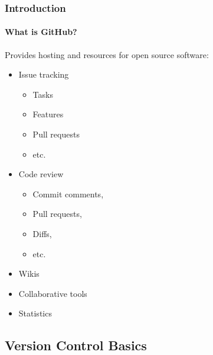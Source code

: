 \documentclass{beamer}
\begin{document}
\begin{frame}
 \frametitle{Introduction}
 \framesubtitle{What is GitHub?}

 Provides hosting and resources for open source software:
 \begin{itemize}
  \item Issue tracking
   \begin{itemize}
    \item Tasks
    \item Features
    \item Pull requests
    \item etc.
   \end{itemize}
  \item Code review
   \begin{itemize}
    \item Commit comments,
    \item Pull requests,
    \item Diffs,
    \item etc.
   \end{itemize}
  \item Wikis
  \item Collaborative tools
  \item Statistics
 \end{itemize}
\end{frame}

\subsection{Version Control Basics}

%
%
\end{document}
